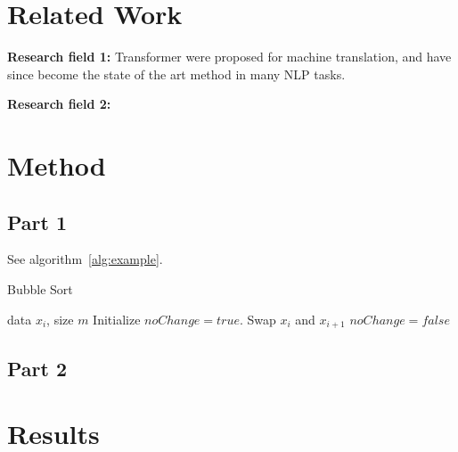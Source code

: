 \documentclass{article}
\begin{document}
\section{Related Work}

\textbf{Research field 1: }Transformer 
\cite{imagenet_cvpr09,vaswani2017attention} were proposed for machine translation, and have since become the state of the art method in many NLP tasks. \lipsum[4]

\textbf{Research field 2: }\lipsum[5]

\section{Method}

\lipsum[6]

\subsection{Part 1}
\lipsum[7-9] See algorithm~\ref{alg:example}.

\begin{algorithm}[tb]
   \caption{Bubble Sort}
   \label{alg:example}
\begin{algorithmic}
    data $x_i$, size $m$
   \REPEAT
   \STATE Initialize $noChange = true$.
   \STATE Swap $x_i$ and $x_{i+1}$
   \STATE $noChange = false$
   \ENDIF
   \ENDFOR
\end{algorithmic}
\end{algorithm}

\subsection{Part 2}
\lipsum[10-12]

\section{Results}

\lipsum[13]
\end{document}

